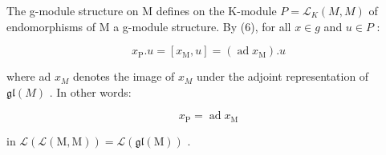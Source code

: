 The g-module structure on M defines on the K-module \(P = \mathcal{L}_{K}(M, M)\) of endomorphisms of M a g-module structure. By (6), for all \(x \in g\) and \(u \in P\) :

\[
x _ {\mathrm{P}}. u = \left[ x _ {\mathrm{M}}, u \right] = (\operatorname{ad} x _ {\mathrm{M}}). u\tag{11}
\]

where ad \(x_{M}\) denotes the image of \(x_{M}\) under the adjoint representation of \(\mathfrak{gl}(M)\) . In other words:

\[
x _ {\mathrm{P}} = \operatorname{ad} x _ {\mathrm{M}}\tag{12}
\]

in \(\mathcal{L}(\mathcal{L}(\mathrm{M},\mathrm{M})) = \mathcal{L}(\mathfrak{gl}(\mathrm{M}))\) .

